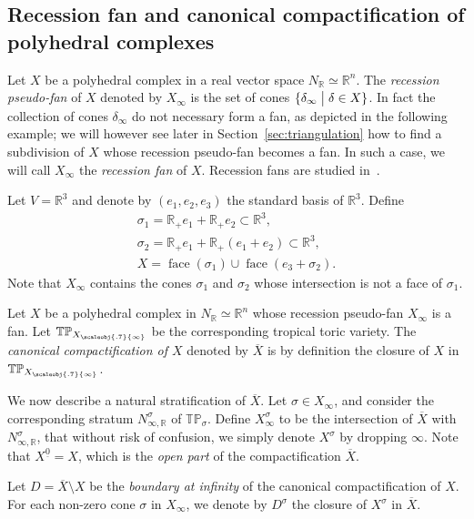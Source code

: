 \documentclass[11pt]{amsart}
\theoremstyle{definition}
\newenvironment{example}
  {\pushQED{\qed}\renewcommand{\qedsymbol}{$\diamond$}\exx}
  {\popQED\endexx}
\numberwithin{equation}{section}
\renewcommand{\~}{\widetilde}
\newcommand{\R}{\mathbb{R}}
\newcommand{\TP}{\mathbb{TP}} %
\newcommand{\st}{\bigm|} %
\newcommand{\comp}[1]{\overline{#1}} %
\newcommand{\sminfty}{{\scaleobj{.7}{\infty}}} %
\newcommand{\conezero}{{\underline0}} %
\DeclareMathOperator{\faceop}{face}
\newcommand{\face}[1]{\faceop(#1)} %
\begin{document}
\subsection{Recession fan and canonical compactification of polyhedral complexes} \label{sec:can-compact-polycomp} Let $X$ be a polyhedral complex in a real vector space $N_\R \simeq \R^n$. The \emph{recession pseudo-fan} of $X$ denoted by $X_\infty$ is the set of cones $\{\delta_\infty\st\delta\in X\}$. In fact the collection of cones $\delta_\infty$ do not necessary form a fan, as depicted in the following example; we will however see later in Section~\ref{sec:triangulation} how to find a subdivision of $X$ whose recession pseudo-fan becomes a fan. In such a case, we will call $X_\infty$ the \emph{recession fan} of $X$. Recession fans are studied in~\cite{BS11}.

\begin{example} Let $V = \R^3$ and denote by $(e_1, e_2, e_3)$ the standard basis of $\R^3$. Define
\begin{gather*}
\sigma_1=\R_+e_1+\R_+e_2\subset\R^3, \\
\sigma_2=\R_+e_1+\R_+(e_1+e_2)\subset\R^3, \\
X=\face{\sigma_1}\cup\faceop\left(e_3+\sigma_2\right).
\end{gather*}
Note that $X_\infty$ contains the cones $\sigma_1$ and $\sigma_2$ whose intersection is not a face of $\sigma_1$.
\end{example}

Let $X$ be a polyhedral complex in $N_\R \simeq \R^n$ whose recession pseudo-fan $X_\infty$ is a fan. Let $\TP_{X_\sminfty}$ be the corresponding tropical toric variety. The \emph{canonical compactification of $X$} denoted by $\comp X$ is by definition the closure of $X$ in $\TP_{X_\sminfty}$.

\medskip

We now describe a natural stratification of $\comp X$. Let $\sigma \in X_\infty$, and consider the corresponding stratum $N^{\sigma}_{\infty, \R}$ of $\TP_\sigma$. Define $X^\sigma_{\infty}$ to be the intersection of $\comp X$ with $N^{\sigma}_{\infty, \R}$, that without risk of confusion, we simply denote $X^\sigma$ by dropping $\infty$. Note that $X^{\conezero} = X$, which is the \emph{open part} of the compactification $\comp X$.

\medskip

Let $D = \comp X \setminus X$ be the \emph{boundary at infinity} of the canonical compactification of $X$. For each non-zero cone $\sigma$ in $X_\infty$, we denote by $D^\sigma$ the closure of $X^\sigma$ in $\comp X$.
\end{document}

